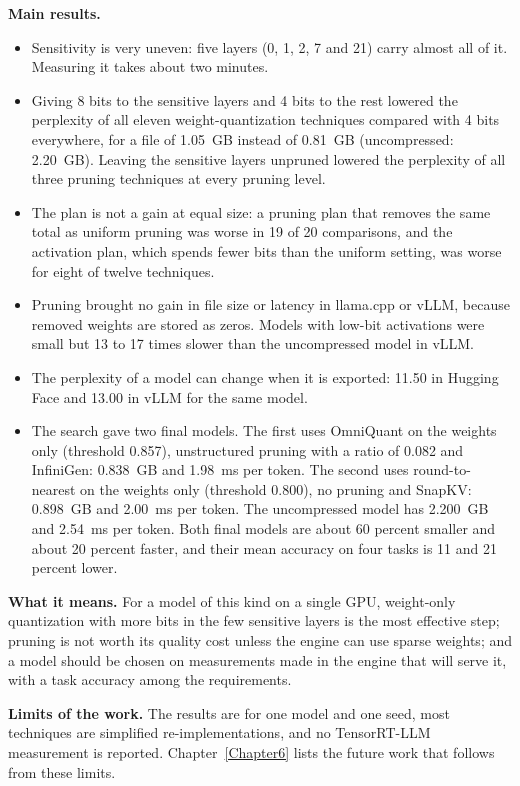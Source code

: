 \medskip\noindent\textbf{Main results.}
\begin{itemize}
  \item Sensitivity is very uneven: five layers (0, 1, 2, 7 and 21) carry almost all of it. Measuring it takes about two minutes.
  \item Giving 8 bits to the sensitive layers and 4 bits to the rest lowered the perplexity of all eleven weight-quantization techniques compared with 4 bits everywhere, for a file of 1.05~GB instead of 0.81~GB (uncompressed: 2.20~GB). Leaving the sensitive layers unpruned lowered the perplexity of all three pruning techniques at every pruning level.
  \item The plan is not a gain at equal size: a pruning plan that removes the same total as uniform pruning was worse in 19 of 20 comparisons, and the activation plan, which spends fewer bits than the uniform setting, was worse for eight of twelve techniques.
  \item Pruning brought no gain in file size or latency in llama.cpp or vLLM, because removed weights are stored as zeros. Models with low-bit activations were small but 13 to 17 times slower than the uncompressed model in vLLM.
  \item The perplexity of a model can change when it is exported: 11.50 in Hugging Face and 13.00 in vLLM for the same model.
  \item The search gave two final models. The first uses OmniQuant on the weights only (threshold 0.857), unstructured pruning with a ratio of 0.082 and InfiniGen: 0.838~GB and 1.98~ms per token. The second uses round-to-nearest on the weights only (threshold 0.800), no pruning and SnapKV: 0.898~GB and 2.00~ms per token. The uncompressed model has 2.200~GB and 2.54~ms per token. Both final models are about 60 percent smaller and about 20 percent faster, and their mean accuracy on four tasks is 11 and 21 percent lower.
\end{itemize}

\noindent\textbf{What it means.} For a model of this kind on a single GPU, weight-only quantization with more bits in the few sensitive layers is the most effective step; pruning is not worth its quality cost unless the engine can use sparse weights; and a model should be chosen on measurements made in the engine that will serve it, with a task accuracy among the requirements.

\medskip\noindent\textbf{Limits of the work.} The results are for one model and one seed, most techniques are simplified re-implementations, and no TensorRT-LLM measurement is reported. Chapter~\ref{Chapter6} lists the future work that follows from these limits.
